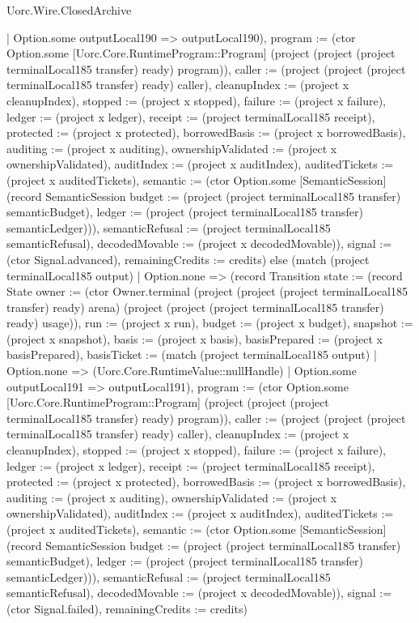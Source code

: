\begin{lexlean}{Uorc.Wire.ClosedArchive}
\begin{semanticmodule}
{{{            | Option.some outputLocal190 => outputLocal190), program := (ctor Option.some [Uorc.Core.RuntimeProgram::Program] (project (project (project terminalLocal185 transfer) ready) program)), caller := (project (project (project terminalLocal185 transfer) ready) caller), cleanupIndex := (project x cleanupIndex), stopped := (project x stopped), failure := (project x failure), ledger := (project x ledger), receipt := (project terminalLocal185 receipt), protected := (project x protected), borrowedBasis := (project x borrowedBasis), auditing := (project x auditing), ownershipValidated := (project x ownershipValidated), auditIndex := (project x auditIndex), auditedTickets := (project x auditedTickets), semantic := (ctor Option.some [SemanticSession] (record SemanticSession {budget := (project (project terminalLocal185 transfer) semanticBudget), ledger := (project (project terminalLocal185 transfer) semanticLedger)})), semanticRefusal := (project terminalLocal185 semanticRefusal), decodedMovable := (project x decodedMovable)}), signal := (ctor Signal.advanced), remainingCredits := credits}) else (match (project terminalLocal185 output)
            | Option.none => (record Transition {state := (record State {owner := (ctor Owner.terminal (project (project (project terminalLocal185 transfer) ready) arena) (project (project (project terminalLocal185 transfer) ready) usage)), run := (project x run), budget := (project x budget), snapshot := (project x snapshot), basis := (project x basis), basisPrepared := (project x basisPrepared), basisTicket := (match (project terminalLocal185 output)
              | Option.none => (Uorc.Core.RuntimeValue::nullHandle)
              | Option.some outputLocal191 => outputLocal191), program := (ctor Option.some [Uorc.Core.RuntimeProgram::Program] (project (project (project terminalLocal185 transfer) ready) program)), caller := (project (project (project terminalLocal185 transfer) ready) caller), cleanupIndex := (project x cleanupIndex), stopped := (project x stopped), failure := (project x failure), ledger := (project x ledger), receipt := (project terminalLocal185 receipt), protected := (project x protected), borrowedBasis := (project x borrowedBasis), auditing := (project x auditing), ownershipValidated := (project x ownershipValidated), auditIndex := (project x auditIndex), auditedTickets := (project x auditedTickets), semantic := (ctor Option.some [SemanticSession] (record SemanticSession {budget := (project (project terminalLocal185 transfer) semanticBudget), ledger := (project (project terminalLocal185 transfer) semanticLedger)})), semanticRefusal := (project terminalLocal185 semanticRefusal), decodedMovable := (project x decodedMovable)}), signal := (ctor Signal.failed), remainingCredits := credits})
}
\end{semanticmodule}
\end{lexlean}
